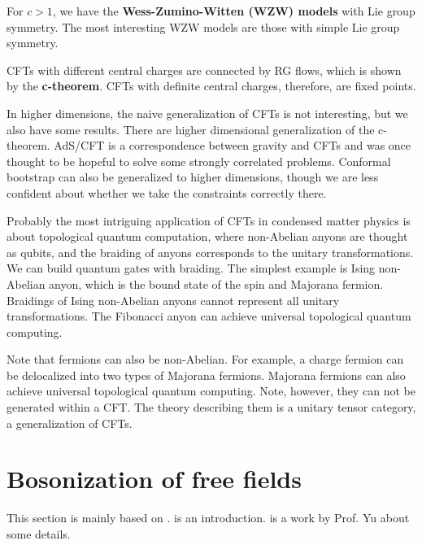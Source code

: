 \documentclass[hyperref, a4paper]{article}
\newcommand*{\concept}[1]{{\textbf{#1}}}
\begin{document}
For $c > 1$, we have the \concept{Wess-Zumino-Witten (WZW) models} with Lie group symmetry.
The most interesting WZW models are those with simple Lie group symmetry.

CFTs with different central charges are connected by RG flows, which is shown by the \concept{c-theorem}. CFTs with definite central charges, therefore, are fixed points.

In higher dimensions, the naive generalization of CFTs is not interesting, but we also have some results.
There are higher dimensional generalization of the c-theorem.
AdS/CFT is a correspondence between gravity and CFTs and was once thought to be hopeful to solve some strongly correlated problems.
Conformal bootstrap can also be generalized to higher dimensions, though we are less confident about whether we take the constraints correctly there. 

Probably the most intriguing application of CFTs in condensed matter physics is about topological quantum computation,
where non-Abelian anyons are thought as qubits, and the braiding of anyons corresponds to the unitary transformations.
We can build quantum gates with braiding.
The simplest example is Ising non-Abelian anyon, which is the bound state of the spin and Majorana fermion.
Braidings of Ising non-Abelian anyons cannot represent all unitary transformations.
The Fibonacci anyon can achieve universal topological quantum computing.

Note that fermions can also be non-Abelian. For example, a charge fermion can be delocalized into two types of Majorana fermions.
Majorana fermions can also achieve universal topological quantum computing.
Note, however, they can not be generated within a CFT. The theory describing them is a unitary tensor category, a generalization of CFTs.

\section{Bosonization of free fields}

This section is mainly based on \cite{onedfermi1995,PhysRevLett.75.890}. 
\cite{onedfermi1995} is an introduction. \cite{PhysRevLett.75.890} is a work by Prof. Yu about some details.
\end{document}

